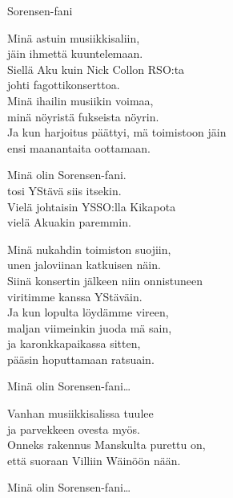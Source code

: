\begin{song}{Sorensen-fani}


    Minä astuin musiikkisaliin,\\
    jäin ihmettä kuuntelemaan.\\
    Siellä Aku kuin Nick Collon RSO:ta\\
    johti fagottikonserttoa.\\
    Minä ihailin musiikin voimaa,\\
    minä nöyristä fukseista nöyrin.\\
    Ja kun harjoitus päättyi, mä toimistoon jäin\\
    ensi maanantaita oottamaan.

    Minä olin Sorensen-fani.\\
    tosi YStävä siis itsekin.\\
    Vielä johtaisin YSSO:lla Kikapota\\
    vielä Akuakin paremmin.

    Minä nukahdin toimiston suojiin,\\
    unen jaloviinan katkuisen näin.\\
    Siinä konsertin jälkeen niin onnistuneen\\
    viritimme kanssa YStäväin.\\
    Ja kun lopulta löydämme vireen,\\
    maljan viimeinkin juoda mä sain,\\
    ja karonkkapaikassa sitten,\\
    pääsin hoputtamaan ratsuain.

    Minä olin Sorensen-fani\dots

    Vanhan musiikkisalissa tuulee\\
    ja parvekkeen ovesta myös.\\
    Onneks rakennus Manskulta purettu on,\\
    että suoraan Villiin Wäinöön nään.

    Minä olin Sorensen-fani\dots

\end{song}